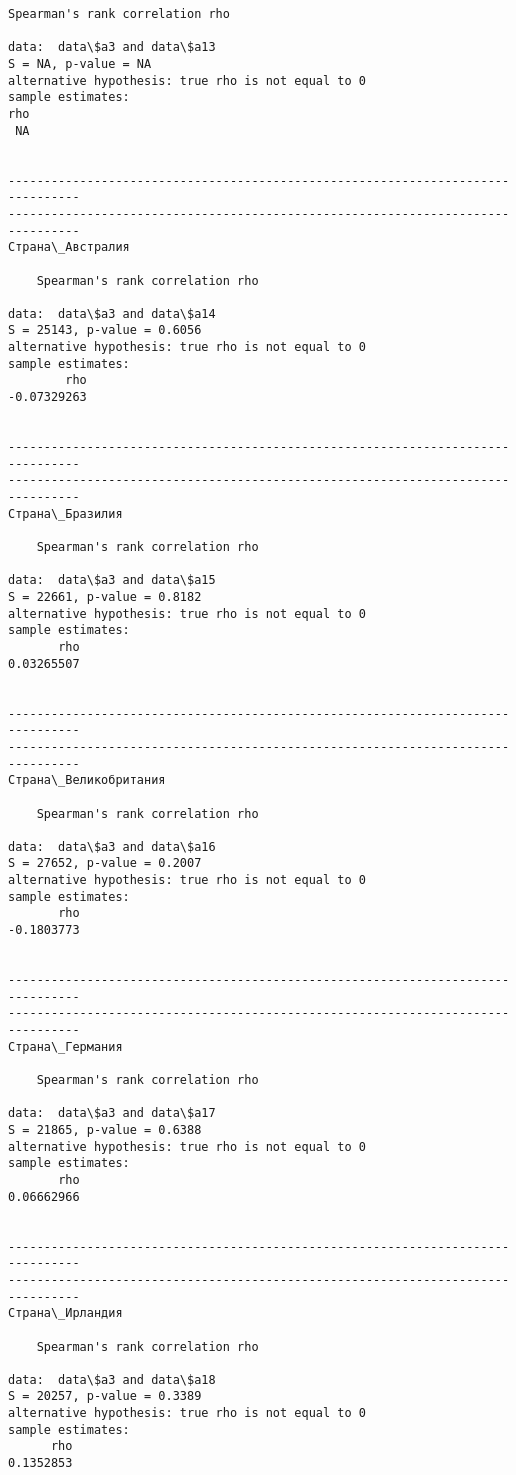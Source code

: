\documentclass[11pt,mathletters]{article}
\begin{document}
\begin{Verbatim}[commandchars=\\\{\}]
	Spearman's rank correlation rho

data:  data\$a3 and data\$a13
S = NA, p-value = NA
alternative hypothesis: true rho is not equal to 0
sample estimates:
rho 
 NA 


--------------------------------------------------------------------------------
--------------------------------------------------------------------------------
Страна\_Австралия

	Spearman's rank correlation rho

data:  data\$a3 and data\$a14
S = 25143, p-value = 0.6056
alternative hypothesis: true rho is not equal to 0
sample estimates:
        rho 
-0.07329263 


--------------------------------------------------------------------------------
--------------------------------------------------------------------------------
Страна\_Бразилия

	Spearman's rank correlation rho

data:  data\$a3 and data\$a15
S = 22661, p-value = 0.8182
alternative hypothesis: true rho is not equal to 0
sample estimates:
       rho 
0.03265507 


--------------------------------------------------------------------------------
--------------------------------------------------------------------------------
Страна\_Великобритания

	Spearman's rank correlation rho

data:  data\$a3 and data\$a16
S = 27652, p-value = 0.2007
alternative hypothesis: true rho is not equal to 0
sample estimates:
       rho 
-0.1803773 


--------------------------------------------------------------------------------
--------------------------------------------------------------------------------
Страна\_Германия

	Spearman's rank correlation rho

data:  data\$a3 and data\$a17
S = 21865, p-value = 0.6388
alternative hypothesis: true rho is not equal to 0
sample estimates:
       rho 
0.06662966 


--------------------------------------------------------------------------------
--------------------------------------------------------------------------------
Страна\_Ирландия

	Spearman's rank correlation rho

data:  data\$a3 and data\$a18
S = 20257, p-value = 0.3389
alternative hypothesis: true rho is not equal to 0
sample estimates:
      rho 
0.1352853 



\end{Verbatim}
\end{document}

